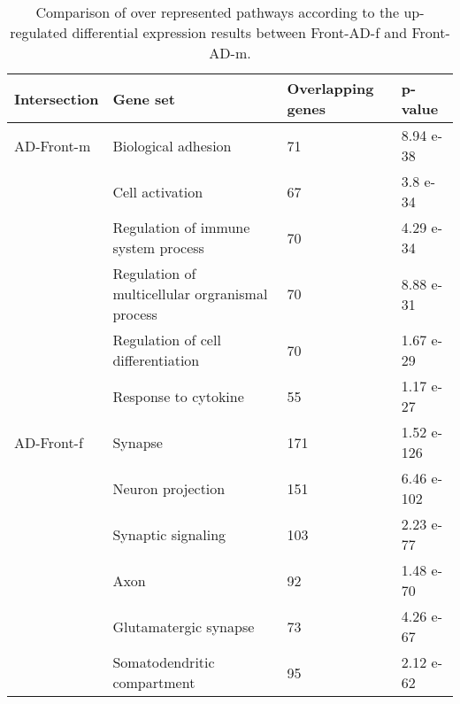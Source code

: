 \begin{table}[!ht]
\centering
\caption{Comparison of over represented pathways according to the up-regulated differential expression results between Front-AD-f and Front-AD-m.}
\begin{tabularx}{11cm}{L{2cm}L{2.5cm}L{3cm}C{1.5cm}}
\toprule
\textbf{Intersection} & \textbf{Gene set} & \textbf{Overlapping genes} & \textbf{p-value} \\
\midrule
AD-Front-m & Biological adhesion                 & 71  & 8.94 e-38  \\
           & Cell activation                     & 67  & 3.8 e-34   \\
           & Regulation of immune system process & 70  & 4.29 e-34  \\
                   & Regulation of multicellular orgranismal process & 70                         & 8.88 e-31        \\
           & Regulation of cell differentiation  & 70  & 1.67 e-29  \\
           & Response to cytokine                & 55  & 1.17 e-27  \\
AD-Front-f & Synapse                             & 171 & 1.52 e-126 \\
           & Neuron projection                   & 151 & 6.46 e-102 \\
           & Synaptic signaling                  & 103 & 2.23 e-77  \\
           & Axon                                & 92  & 1.48 e-70  \\
           & Glutamatergic synapse               & 73  & 4.26 e-67  \\
           & Somatodendritic compartment         & 95  & 2.12 e-62  \\ 
\bottomrule

\end{tabularx}
\end{table}


